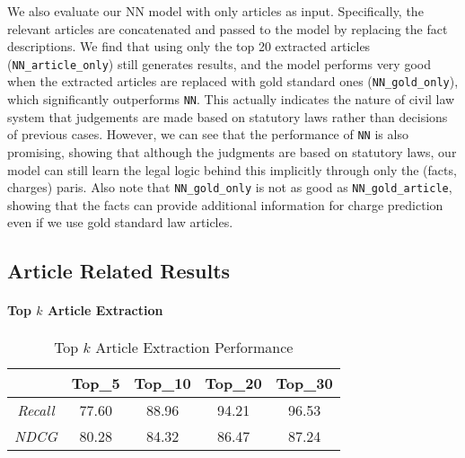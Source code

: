 We also evaluate our NN model with only articles as input. Specifically, the relevant articles are concatenated and passed to the model by replacing the fact descriptions. We find that using only the top 20 extracted articles (\texttt{NN\_article\_only}) still generates  results, and the model performs very good when the extracted articles are replaced with gold standard ones (\texttt{NN\_gold\_only}), which significantly outperforms \texttt{NN}. 
This actually indicates the nature of civil law system that judgements are made based on statutory laws rather than decisions of previous cases.
However, we can see that the performance of \texttt{NN} is also promising, showing that although the judgments are based on statutory laws, our model can still learn the legal logic behind this implicitly through only the (facts, charges) paris. 
Also note that \texttt{NN\_gold\_only} is not as good as \texttt{NN\_gold\_article}, showing that the facts can provide additional information for charge prediction even if we use gold standard law articles.


\subsection{Article Related Results}
\paragraph{Top $k$ Article Extraction}
\begin{table}
\centering
\normalsize{
\begin{tabular}{|c|c|c|c|c|}
\hline
				& \textbf{Top\_5} 	& \textbf{Top\_10} 		& \textbf{Top\_20} 	& \textbf{Top\_30} \\
\hline
\textit{Recall} 		& 77.60			& 88.96  				& 94.21			& 96.53 	\\
\hline
\textit{NDCG} 		& 80.28			& 84.32  				& 86.47			& 87.24 	\\
\hline
\end{tabular}
}
\caption{Top $k$ Article Extraction Performance}
\label{tab_article_extraction}
\end{table}

